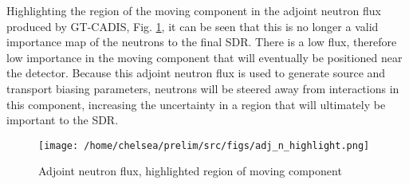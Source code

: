 Highlighting the region of the moving component in the  adjoint neutron flux
produced by GT-CADIS, Fig. \ref{fig:highlight}, it can be seen that this 
is no longer a valid importance map
of the neutrons to the final SDR. There is a low flux, therefore low
importance in the moving component that will eventually be positioned 
near the detector.  Because this adjoint neutron flux is used to generate
source and transport biasing parameters, neutrons will be steered away from 
interactions in this component, increasing the uncertainty in a region that will
ultimately be important to the SDR. 

\begin{figure} 
	\texttt{[image: /home/chelsea/prelim/src/figs/adj\_n\_highlight.png]}
	\caption[Adjoint neutron flux, highlighted region of moving component]
	{Adjoint neutron flux, highlighted region of moving component
	\label{fig:highlight}}
\end{figure}


